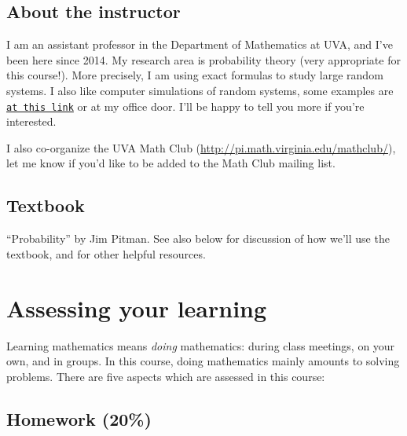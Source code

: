 \documentclass[oneside,11pt]{amsart}
\begin{document}
\subsection{About the instructor}
I am an assistant professor in the Department of Mathematics at UVA, and I've
been here since 2014. My research area is probability theory (very appropriate
for this course!). More precisely, I am using exact formulas to study large
random systems. I also like computer simulations of random systems, some
examples are
\href{http://faculty.virginia.edu/petrov//blog/2016/09/16/random-heart/}{\texttt{at
this link}} or at my office door.  I'll be happy to tell you more if you're
interested.

I also co-organize the UVA Math Club (\url{http://pi.math.virginia.edu/mathclub/}),
let me know if you'd like to be added to the Math Club mailing list.

\subsection{Textbook}

``Probability'' by Jim Pitman.
See also  below for discussion 
of how we'll use the textbook,
and for other helpful resources.

\section{Assessing your learning}

Learning mathematics means \emph{doing} mathematics: during class meetings, on your own, and in groups.
In this course, doing mathematics mainly amounts to solving problems.
There are five aspects which are assessed in this course:

\subsection{Homework (20\%)}
\end{document}
